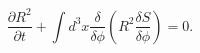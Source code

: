 \begin{equation}
\frac{\partial R^{2}}{\partial t}+\int d^{3}x\frac{\delta}{\delta\phi}\left(
R^{2}\frac{\delta S}{\delta\phi}\right)  =0.\label{21}%
\end{equation}

